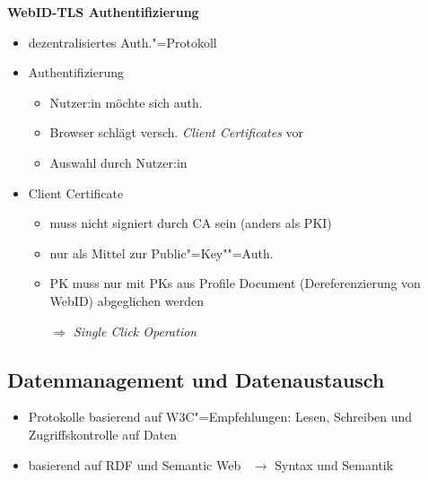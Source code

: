 \textbf{WebID-TLS Authentifizierung}
\begin{itemize}
    \item dezentralisiertes Auth."=Protokoll~\cite{sambraSolidPlatformDecentralized2016}
    \item Authentifizierung~\cite{sambraSolidPlatformDecentralized2016}
    \begin{itemize}
        \item Nutzer:in möchte sich auth.
        \item Browser schlägt versch. \emph{Client Certificates} vor
        \item Auswahl durch Nutzer:in
    \end{itemize}
    \item Client Certificate~\cite{sambraSolidPlatformDecentralized2016}
    \begin{itemize}
        \item muss nicht signiert durch CA sein (anders als PKI)
        \item nur als Mittel zur Public"=Key""=Auth.
        \item PK muss nur mit PKs aus Profile Document (Dereferenzierung von WebID) abgeglichen werden
        \item[$\Rightarrow$] \emph{Single Click Operation}~\cite{sambraSolidPlatformDecentralized2016}
    \end{itemize}
\end{itemize}


\subsection{Datenmanagement und Datenaustausch}

\begin{itemize}
    \item Protokolle basierend auf W3C"=Empfehlungen: Lesen, Schreiben und Zugriffskontrolle auf Daten~\cite{sambraSolidPlatformDecentralized2016}
    \item basierend auf RDF und Semantic Web~\cite{sambraSolidPlatformDecentralized2016} $\to$ Syntax und Semantik~\cite{mecklerWebLinkedData2023}
\end{itemize}

\vspace{1cm}

